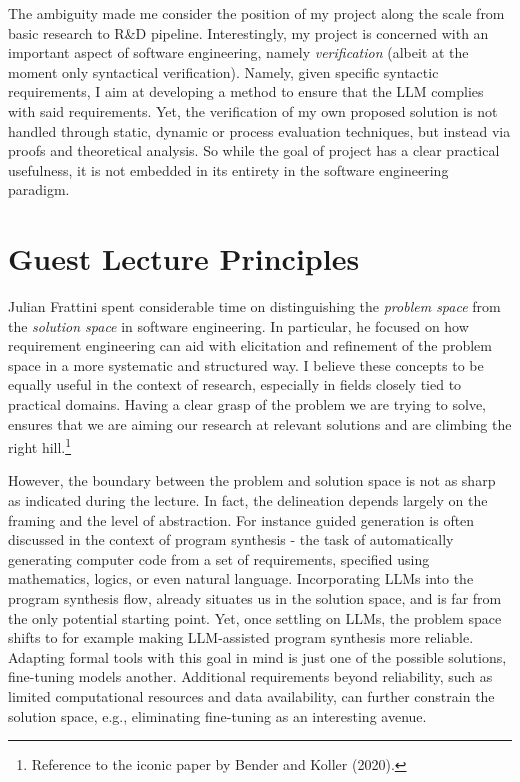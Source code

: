 \documentclass[a4paper, 11pt]{article}
\begin{document}
The ambiguity made me consider the position of my project along the scale from basic research to R\&D pipeline. Interestingly, my project is concerned with an important aspect of software engineering, namely \emph{verification} (albeit at the moment only syntactical verification). Namely, given specific syntactic requirements, I aim at developing a method to ensure that the LLM complies with said requirements. Yet, the verification of my own proposed solution is not handled through static, dynamic or process  evaluation techniques, but instead via proofs and theoretical analysis. So while the goal of project has a clear practical usefulness, it is not embedded in its entirety in the software engineering paradigm. 

\section{Guest Lecture Principles}
Julian Frattini spent considerable time on distinguishing the \emph{problem space} from the \emph{solution space} in software engineering. In particular, he focused on how requirement engineering can aid with elicitation and refinement of the problem space in a more systematic and structured way. I believe these concepts to be equally useful in the context of research, especially in fields closely tied to practical domains. Having a clear grasp of the problem we are trying to solve, ensures that we are aiming our research at relevant solutions and are climbing the right hill.\footnote{Reference to the iconic paper by Bender and Koller (2020).}

However, the boundary between the problem and solution space is not as sharp as indicated during the lecture. In fact, the delineation depends largely on the framing and the level of abstraction.  For instance guided generation is often discussed in the context of program synthesis - the task of automatically generating computer code from a set of requirements, specified using mathematics, logics, or even natural language. Incorporating LLMs into the program synthesis flow, already situates us in the solution space, and is far from the only potential starting point. Yet, once settling on LLMs, the problem space shifts to for example making LLM-assisted program synthesis more reliable. Adapting formal tools with this goal in mind is just one of the possible solutions, fine-tuning models another. Additional requirements beyond reliability, such as limited computational resources and data availability, can further constrain the solution space, e.g., eliminating fine-tuning as an interesting avenue.
\end{document}
